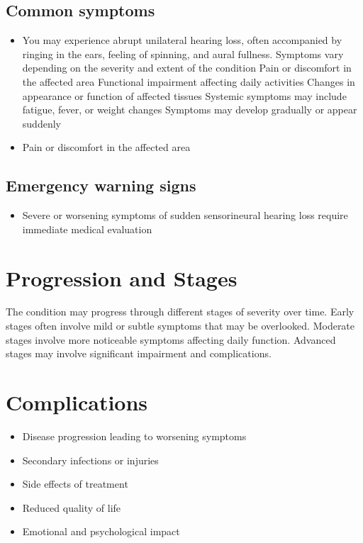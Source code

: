 \subsection{Common symptoms}
\begin{itemize}[noitemsep]
  \item You may experience abrupt unilateral hearing loss, often accompanied by ringing in the ears, feeling of spinning, and aural fullness. Symptoms vary depending on the severity and extent of the condition Pain or discomfort in the affected area Functional impairment affecting daily activities Changes in appearance or function of affected tissues Systemic symptoms may include fatigue, fever, or weight changes Symptoms may develop gradually or appear suddenly
  \item Pain or discomfort in the affected area
  \end{itemize}

\subsection{Emergency warning signs}
\begin{itemize}[noitemsep]
  \item Severe or worsening symptoms of sudden sensorineural hearing loss require immediate medical evaluation
\end{itemize}
\section{Progression and Stages}
The condition may progress through different stages of severity over time. Early stages often involve mild or subtle symptoms that may be overlooked. Moderate stages involve more noticeable symptoms affecting daily function. Advanced stages may involve significant impairment and complications.
\section{Complications}
\begin{itemize}[noitemsep]
  \item Disease progression leading to worsening symptoms
  \item Secondary infections or injuries
  \item Side effects of treatment
  \item Reduced quality of life
  \item Emotional and psychological impact
\end{itemize}
